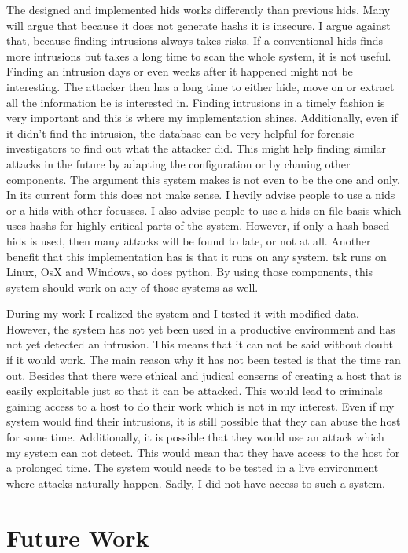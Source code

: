 \documentclass[
	a4paper,					%
	10pt,							%
	twoside,					%
	openright,				%
	notitlepage,			%
	parskip=half,			%
]{scrreprt}					%
\begin{document}
The designed and implemented \gls{hids} works differently than previous \gls{hids}. Many will argue that because it does not generate \glspl{hash} it is insecure. I argue against that, because finding intrusions always takes risks. If a conventional \gls{hids} finds more intrusions but takes a long time to scan the whole system, it is not useful. Finding an intrusion days or even weeks after it happened might not be interesting. The attacker then has a long time to either hide, move on or extract all the information he is interested in. Finding intrusions in a timely fashion is very important and this is where my implementation shines. Additionally, even if it didn't find the intrusion, the database can be very helpful for forensic investigators to find out what the attacker did. This might help finding similar attacks in the future by adapting the configuration or by chaning other components. The argument this system makes is not even to be the one and only. In its current form this does not make sense. I hevily advise people to use a \gls{nids} or a \gls{hids} with other focusses. I also advise people to use a \gls{hids} on file basis which uses \glspl{hash} for highly critical parts of the system. However, if only a hash based \gls{hids} is used, then many attacks will be found to late, or not at all. Another benefit that this implementation has is that it runs on any system. \gls{tsk} runs on Linux, OsX and Windows, so does python. By using those components, this system should work on any of those systems as well.

During my work I realized the system and I tested it with modified data. However, the system has not yet been used in a productive environment and has not yet detected an intrusion. This means that it can not be said without doubt if it would work. The main reason why it has not been tested is that the time ran out. Besides that there were ethical and judical conserns of creating a host that is easily exploitable just so that it can be attacked. This would lead to criminals gaining access to a host to do their work which is not in my interest. Even if my system would find their intrusions, it is still possible that they can abuse the host for some time. Additionally, it is possible that they would use an attack which my system can not detect. This would mean that they have access to the host for a prolonged time. The system would needs to be tested in a live environment where attacks naturally happen. Sadly, I did not have access to such a system. 

\section{Future Work}
\label{sec:future:work}
\end{document}
